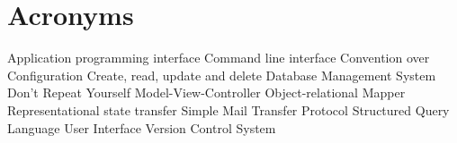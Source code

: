 \newpage
\section{Acronyms}
\begin{acronym}
	  {Application programming interface}
	  {Command line interface}
	  {Convention over Configuration}
	 {Create, read, update and delete}
	 {Database Management System}
	  {Don't Repeat Yourself}
	  {Model-View-Controller}
	  {Object-relational Mapper}
	 {Representational state transfer}
	 {Simple Mail Transfer Protocol}
	  {Structured Query Language}
		{User Interface}
		{Version Control System}
\end{acronym}
